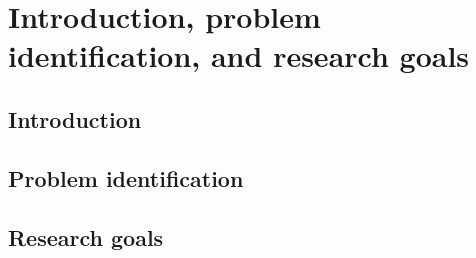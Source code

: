 \chapter{Introduction, problem identification, and research goals}

\clearpage

\section{Introduction}

\section{Problem identification}

\section{Research goals}